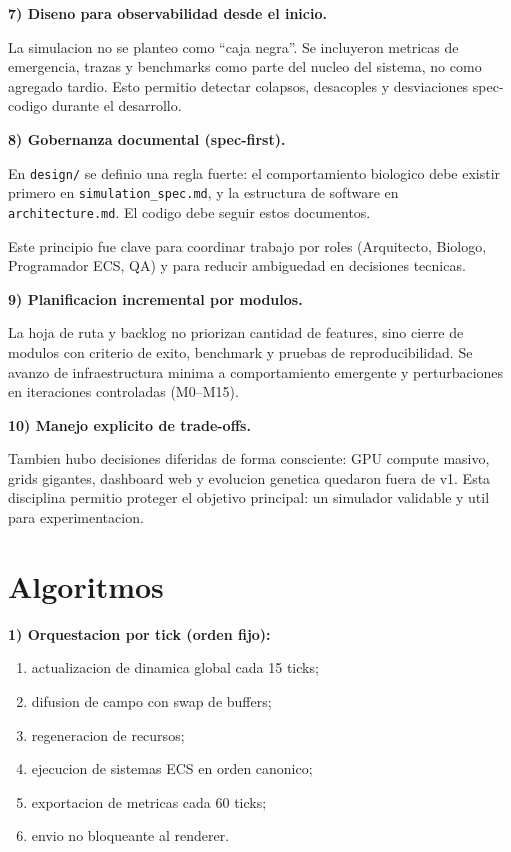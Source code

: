 \documentclass[11pt]{article}
\begin{document}
\textbf{7) Diseno para observabilidad desde el inicio.}

La simulacion no se planteo como ``caja negra''. Se incluyeron metricas de emergencia, trazas y benchmarks como parte del nucleo del sistema, no como agregado tardio. Esto permitio detectar colapsos, desacoples y desviaciones spec-codigo durante el desarrollo.

\textbf{8) Gobernanza documental (spec-first).}

En \texttt{design/} se definio una regla fuerte: el comportamiento biologico debe existir primero en \texttt{simulation\_spec.md}, y la estructura de software en \texttt{architecture.md}. El codigo debe seguir estos documentos.

Este principio fue clave para coordinar trabajo por roles (Arquitecto, Biologo, Programador ECS, QA) y para reducir ambiguedad en decisiones tecnicas.

\textbf{9) Planificacion incremental por modulos.}

La hoja de ruta y backlog no priorizan cantidad de features, sino cierre de modulos con criterio de exito, benchmark y pruebas de reproducibilidad. Se avanzo de infraestructura minima a comportamiento emergente y perturbaciones en iteraciones controladas (M0--M15).

\textbf{10) Manejo explicito de trade-offs.}

Tambien hubo decisiones diferidas de forma consciente: GPU compute masivo, grids gigantes, dashboard web y evolucion genetica quedaron fuera de v1. Esta disciplina permitio proteger el objetivo principal: un simulador validable y util para experimentacion.

\section*{Algoritmos}

\textbf{1) Orquestacion por tick (orden fijo):}

\begin{enumerate}
  \item actualizacion de dinamica global cada 15 ticks;
  \item difusion de campo con swap de buffers;
  \item regeneracion de recursos;
  \item ejecucion de sistemas ECS en orden canonico;
  \item exportacion de metricas cada 60 ticks;
  \item envio no bloqueante al renderer.
\end{enumerate}
\end{document}
